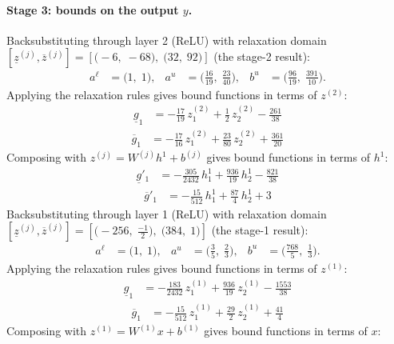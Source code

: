 \documentclass[11pt]{article}
\begin{document}
\paragraph{Stage 3: bounds on the output $y$.}
Backsubstituting through layer 2 (ReLU) with relaxation domain $[\underline{z}^{(j)}, \overline{z}^{(j)}] = [\bigl(-6,\; -68\bigr),\; \bigl(32,\; 92\bigr)]$ (the stage-2 result):
\begin{align*}
a^{\ell} &= \bigl(1,\; 1\bigr), & a^{u} &= \bigl(\frac{16}{19},\; \frac{23}{40}\bigr), & b^{u} &= \bigl(\frac{96}{19},\; \frac{391}{10}\bigr).
\end{align*}
Applying the relaxation rules gives bound functions in terms of $z^{(2)}$:
\begin{align*}
\underline{g}_{1} &= -\frac{17}{19}\,z^{(2)}_{1} + \frac{1}{2}\,z^{(2)}_{2} - \frac{261}{38}
\end{align*}
\begin{align*}
\overline{g}_{1} &= -\frac{17}{16}\,z^{(2)}_{1} + \frac{23}{80}\,z^{(2)}_{2} + \frac{361}{20}
\end{align*}
Composing with $z^{(j)} = W^{(j)} h^{1} + b^{(j)}$ gives bound functions in terms of $h^{1}$:
\begin{align*}
\underline{g}'_{1} &= -\frac{305}{2432}\,h^{1}_{1} + \frac{936}{19}\,h^{1}_{2} - \frac{821}{38}
\end{align*}
\begin{align*}
\overline{g}'_{1} &= -\frac{15}{512}\,h^{1}_{1} + \frac{87}{4}\,h^{1}_{2} + 3
\end{align*}
Backsubstituting through layer 1 (ReLU) with relaxation domain $[\underline{z}^{(j)}, \overline{z}^{(j)}] = [\bigl(-256,\; \frac{-1}{2}\bigr),\; \bigl(384,\; 1\bigr)]$ (the stage-1 result):
\begin{align*}
a^{\ell} &= \bigl(1,\; 1\bigr), & a^{u} &= \bigl(\frac{3}{5},\; \frac{2}{3}\bigr), & b^{u} &= \bigl(\frac{768}{5},\; \frac{1}{3}\bigr).
\end{align*}
Applying the relaxation rules gives bound functions in terms of $z^{(1)}$:
\begin{align*}
\underline{g}_{1} &= -\frac{183}{2432}\,z^{(1)}_{1} + \frac{936}{19}\,z^{(1)}_{2} - \frac{1553}{38}
\end{align*}
\begin{align*}
\overline{g}_{1} &= -\frac{15}{512}\,z^{(1)}_{1} + \frac{29}{2}\,z^{(1)}_{2} + \frac{41}{4}
\end{align*}
Composing with $z^{(1)} = W^{(1)} x + b^{(1)}$ gives bound functions in terms of $x$:
\end{document}
